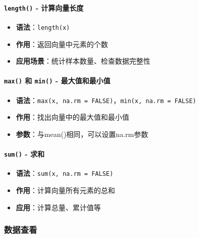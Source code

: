 \documentclass[
]{book}
\providecommand{\tightlist}{%
  \setlength{\itemsep}{0pt}\setlength{\parskip}{0pt}}
\begin{document}
\hypertarget{length---ux8ba1ux7b97ux5411ux91cfux957fux5ea6}{%
\paragraph{\texorpdfstring{\texttt{length()} - 计算向量长度}{length() - 计算向量长度}}\label{length---ux8ba1ux7b97ux5411ux91cfux957fux5ea6}}

\begin{itemize}
\tightlist
\item
  \textbf{语法}：\texttt{length(x)}
\item
  \textbf{作用}：返回向量中元素的个数
\item
  \textbf{应用场景}：统计样本数量、检查数据完整性
\end{itemize}

\hypertarget{max-ux548c-min---ux6700ux5927ux503cux548cux6700ux5c0fux503c}{%
\paragraph{\texorpdfstring{\texttt{max()} 和 \texttt{min()} - 最大值和最小值}{max() 和 min() - 最大值和最小值}}\label{max-ux548c-min---ux6700ux5927ux503cux548cux6700ux5c0fux503c}}

\begin{itemize}
\tightlist
\item
  \textbf{语法}：\texttt{max(x,\ na.rm\ =\ FALSE)}，\texttt{min(x,\ na.rm\ =\ FALSE)}
\item
  \textbf{作用}：找出向量中的最大值和最小值
\item
  \textbf{参数}：与mean()相同，可以设置na.rm参数
\end{itemize}

\hypertarget{sum---ux6c42ux548c}{%
\paragraph{\texorpdfstring{\texttt{sum()} - 求和}{sum() - 求和}}\label{sum---ux6c42ux548c}}

\begin{itemize}
\tightlist
\item
  \textbf{语法}：\texttt{sum(x,\ na.rm\ =\ FALSE)}
\item
  \textbf{作用}：计算向量所有元素的总和
\item
  \textbf{应用}：计算总量、累计值等
\end{itemize}

\hypertarget{ux6570ux636eux67e5ux770b}{%
\subsubsection{数据查看}\label{ux6570ux636eux67e5ux770b}}
\end{document}
